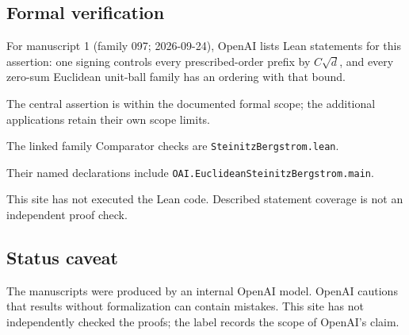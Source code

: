 \documentclass[11pt]{article}
\begin{document}
\subsection{Formal verification}
For manuscript 1 (family 097; 2026-09-24), OpenAI lists Lean statements for this assertion: one signing controls every prescribed-order prefix by $C\sqrt d$, and every zero-sum Euclidean unit-ball family has an ordering with that bound.

The central assertion is within the documented formal scope; the additional applications retain their own scope limits.

The linked family Comparator checks are \texttt{SteinitzBergstrom.lean}.

Their named declarations include \texttt{OAI.EuclideanSteinitzBergstrom.main}.

This site has not executed the Lean code. Described statement coverage is not an independent proof check.

\subsection{Status caveat}
The manuscripts were produced by an internal OpenAI model. OpenAI cautions that results without formalization can contain mistakes. This site has not independently checked the proofs; the label records the scope of OpenAI's claim.
\end{document}
